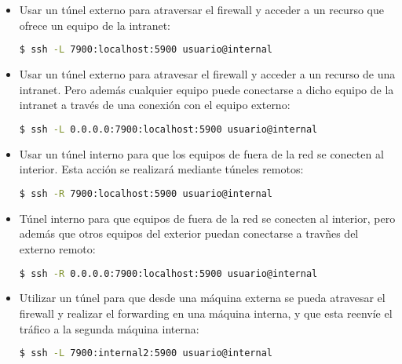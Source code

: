 \documentclass[a4paper, 11pt, titlepage]{article}
\begin{document}
        \begin{itemize}
            \item Usar un túnel externo para atraversar el firewall y acceder a un recurso que ofrece un equipo 
            de la intranet:

            \begin{lstlisting}[language=bash,basicstyle=\footnotesize]
    $ ssh -L 7900:localhost:5900 usuario@internal\end{lstlisting}

            \item Usar un túnel externo para atravesar el firewall y acceder a un recurso de una intranet.
            Pero además cualquier equipo puede conectarse a dicho equipo de la intranet a través de una 
            conexión con el equipo externo:

            \begin{lstlisting}[language=bash,basicstyle=\footnotesize]
    $ ssh -L 0.0.0.0:7900:localhost:5900 usuario@internal\end{lstlisting}
            
            \item Usar un túnel interno para que los equipos de fuera de la red se conecten al interior. 
            Esta acción se realizará mediante túneles remotos:

            \begin{lstlisting}[language=bash,basicstyle=\footnotesize]
    $ ssh -R 7900:localhost:5900 usuario@internal\end{lstlisting}
            
            \item Túnel interno para que equipos de fuera de la red se conecten al interior, pero además que 
            otros equipos del exterior puedan conectarse a travñes del externo remoto:

            \begin{lstlisting}[language=bash,basicstyle=\footnotesize]
    $ ssh -R 0.0.0.0:7900:localhost:5900 usuario@internal\end{lstlisting}

            \item Utilizar un túnel para que desde una máquina externa se pueda atravesar el firewall y 
            realizar el forwarding en una máquina interna, y que esta reenvíe el tráfico a la segunda 
            máquina interna:

            \begin{lstlisting}[language=bash,basicstyle=\footnotesize]
    $ ssh -L 7900:internal2:5900 usuario@internal\end{lstlisting}

        \end{itemize}
\end{document}
